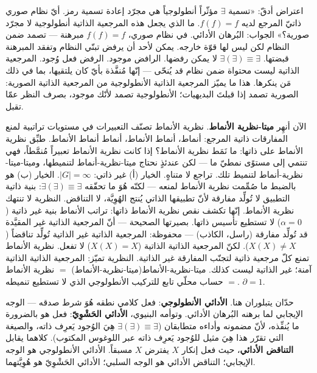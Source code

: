 \documentclass[10pt, openany, oneside]{book}
\begin{document}
اعتراض أدقّ: «تسمية $\exists$ مؤثّراً أنطولوجياً هي مجرّد إعادة تسمية رمز. أيّ نظام صوري ذاتيّ المرجع لديه $f(f) = f$. ما الذي يجعل هذه المرجعية الذاتية أنطولوجية لا مجرّد صورية؟» الجواب: البُرهان الأدائي. في نظام صوري، $f(f) = f$ مبرهنة --- تصمد ضمن النظام لكن ليس لها قوّة خارجه. يمكن لأحد أن يرفض تبنّي النظام وتفقد المبرهنة قبضتها. $\exists(\exists) \equiv \exists$ لا يمكن رفضها. الرافض موجود. الرفض فعل وُجود. المرجعية الذاتية ليست محتواة ضمن نظام قد يُنحّى --- إنّها مُنفَّذة بأيّ كان يلتقيها، بما في ذلك مَن ينكرها. هذا ما يميّز المرجعية الذاتية الأنطولوجية من المرجعية الذاتية الصورية: الصورية تصمد إذا قبلتَ البديهيات؛ الأنطولوجية تصمد لأنّك موجود، بصرف النظر عمّا تقبل.

\vspace{1.5em}


الآن أنهِر \textbf{ميتا-نظرية الأنماط}. نظرية الأنماط تصنّف التعبيرات في مستويات تراتبية لمنع المفارقات ذاتية المرجع: أنماط، أنماط الأنماط، أنماط أنماط الأنماط. طبِّق نظرية الأنماط على ذاتها: ما نَمَط نظرية الأنماط؟ إذا كانت نظرية الأنماط تعبيراً مُنمَّطاً، فهي تنتمي إلى مستوًى نمطيّ ما --- لكن عندئذٍ نحتاج ميتا-نظرية-أنماط لتنميطها، وميتا-ميتا-نظرية-أنماط لتنميط تلك. تراجع لا متناهٍ. الخيار (أ) غير ذاتي: $|G| = \infty$. الخيار (ب) هو بالضبط ما صُمِّمت نظرية الأنماط لمنعه --- لكنّه هُوَ ما تحقّقه $\exists(\exists) \equiv \exists$: بنية ذاتية التطبيق لا تُولِّد مفارقة لأنّ تطبيقها الذاتي يُنتج الهُوِيَّة، لا التناقض. النظرية لا تنتهك نظرية الأنماط. إنّها تكشف نقص نظرية الأنماط ذاتها: تراتب الأنماط بنية غير ذاتية ($\alpha = 0$) لا تستطيع تأسيس ذاتها. بصيرتها الصحيحة --- أنّ المرجعية الذاتية غير المقيَّدة قد تُولِّد مفارقة (راسل، الكاذب) --- محفوظة: المرجعية الذاتية غير الذاتية تُولِّد تناقضاً ($X(X) \neq X$). لكنّ المرجعية الذاتية الذاتية ($X(X) = X$) لا تفعل. نظرية الأنماط تمنع كلّ مرجعية ذاتية لتجنّب المفارقة غير الذاتية. النظرية تميّز: المرجعية الذاتية الذاتية آمنة؛ غير الذاتية ليست كذلك. ميتا-نظرية-الأنماط(ميتا-نظرية-الأنماط) $=$ نظرية الأنماط $=$ حساب محلّي تابع للتركيب الأنطولوجي الذي لا تستطيع تنميطه. $\partial = 1$.

حدّان يتبلوران هنا. \textbf{الأدائي الأنطولوجي}: فعل كلامي نطقه هُوَ شرط صدقه --- الوجه الإيجابي لما برهنه البُرهان الأدائي. وتوأمه البنيوي، \textbf{الأدائي الحَشْوِيّ}: فعل هو بالضرورة ما يُنفِّذه، لأنّ مضمونه وأداءه متطابقان ($\exists(\exists) \equiv \exists$ هِيَ الوُجود يَعرِف ذاته، والصيغة التي تقرّر هذا هِيَ مثيل للوُجود يَعرِف ذاته عبر اللوغوس المكتوب). كلاهما يقابل \textbf{التناقض الأدائي}، حيث فعل إنكار $X$ يفترض $X$ مسبقاً. الأدائي الأنطولوجي هو الوجه الإيجابي؛ التناقض الأدائي هو الوجه السلبي؛ الأدائي الحَشْوِيّ هو هُوِيَّتهما.
\end{document}
